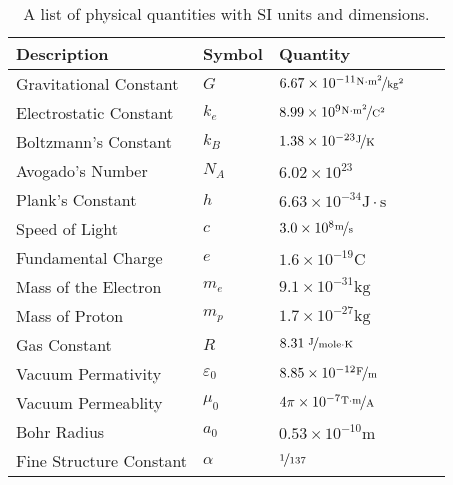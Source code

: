 \documentclass{article}
\begin{document}
\begin{table}[htbp]
\begin{center}
\footnotesize
\begin{tabular}{lllll}
\toprule
 Description              & Symbol          & Quantity                                                                \\
\midrule
  Gravitational Constant   & $G$             & $6.67 \times 10^{-11} \nicefrac{ \text{N}\cdot\text{m}^2}{\text{kg}^2}$ \\
    Electrostatic Constant   & $k_e$           & $8.99 \times 10^{9} \nicefrac{ \text{N}\cdot\text{m}^2}{\text{C}^2}$    \\
    Boltzmann's Constant     & $k_B$           & $1.38 \times 10^{-23} \nicefrac{ \text{J}}{\text{K}}$                   \\
    Avogado's Number         & $N_A$           & $6.02 \times 10^{23} $                                                  \\
    Plank's Constant         & $h$             & $6.63 \times 10^{-34}  \text{J}\cdot\text{s}$                           \\
    Speed of Light           & $c$             & $3.0 \times 10^{8} \nicefrac{ \text{m}}{\text{s}}$                      \\
    Fundamental Charge       & $e$             & $1.6 \times 10^{-19} \text{C}$                                          \\
    Mass of the Electron     & $m_e$           & $9.1 \times 10^{-31} \text{kg}$                                         \\
    Mass of Proton           & $m_p$           & $1.7 \times 10^{-27} \text{kg}$                                         \\ 
    Gas Constant             & $R$             & $8.31 \nicefrac{ \text{ J}}{\text{mole}\cdot\text{K}}$                  \\
    Vacuum Permativity       & $\varepsilon_0$ & $8.85 \times 10^{-12} \nicefrac{ \text{F}}{\text{m}}$                    \\
    Vacuum Permeablity       & $\mu_0$         & $4\pi \times 10^{-7} \nicefrac{ \text{T}\cdot\text{m}}{\text{A}}$       \\
    Bohr Radius              & $a_0$           & $0.53 \times 10^{-10} \text{m}$                                         \\
    Fine Structure  Constant & $\alpha$        & $\nicefrac{1}{137}$                                              \\ 

\bottomrule
\end{tabular}
\end{center}
  \caption{A list of physical quantities with SI units and dimensions.}
  \label{tab:font-sizes}
\end{table}
\end{document}
